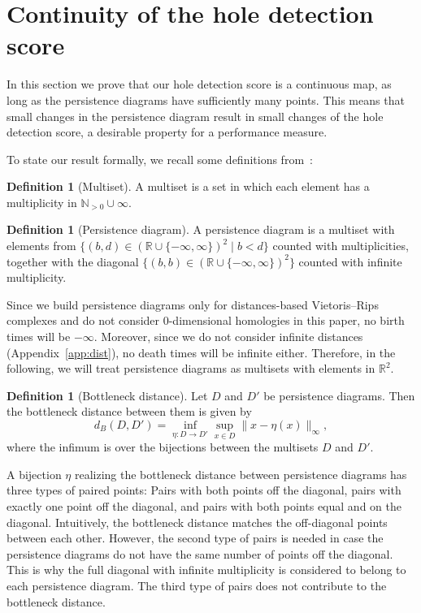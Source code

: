 \documentclass{article}
\theoremstyle{plain}
\theoremstyle{definition}
\newtheorem{definition}[theorem]{Definition}
\theoremstyle{remark}
\begin{document}
\section{Continuity of the hole detection score}\label{app:score_cont}

In this section we prove that our hole detection score is a continuous map, as long as the persistence diagrams have sufficiently many points. This means that small changes in the persistence diagram result in small changes of the hole detection score, a desirable property for a performance measure.

To state our result formally, we recall some definitions from~\citet{cohen2005stability}:

\begin{definition}[Multiset]
    A multiset is a set in which each element has a multiplicity in $\mathbb{N}_{>0}\cup {\infty}$.
\end{definition}

\begin{definition}[Persistence diagram]
    A persistence diagram is a multiset with elements from
    $\{(b, d) \in (\mathbb{R} \cup \{-\infty, \infty\})^2 \mid b<d\}$ counted with multiplicities, together with the diagonal $\{(b,b) \in (\mathbb{R} \cup \{-\infty, \infty\})^2\}$ counted with infinite multiplicity.
\end{definition}

Since we build persistence diagrams only for distances-based Vietoris--Rips complexes and do not consider $0$-dimensional homologies in this paper, no birth times will be $-\infty$. Moreover, since we do not consider infinite distances (Appendix~\ref{app:dist}), no death times will be infinite either. Therefore, in the following, we will treat persistence diagrams as multisets with elements in $\mathbb{R}^2$.

\begin{definition}[Bottleneck distance]
    Let $D$ and $D'$ be persistence diagrams. Then the bottleneck distance between them is given by 
    $$
    d_B(D, D')= \inf_{\eta: D\to D'} \sup_{x\in D} \|x-\eta(x)\|_\infty,
    $$
    where the infimum is over the bijections between the multisets $D$ and $D'$.
\end{definition}

A bijection $\eta$ realizing the bottleneck distance between persistence diagrams has three types of paired points: Pairs with both points off the diagonal, pairs with exactly one point off the diagonal, and pairs with both points equal and on the diagonal. Intuitively, the bottleneck distance matches the off-diagonal points between each other. However, the second type of pairs is needed in case the persistence diagrams do not have the same number of points off the diagonal. This is why the full diagonal with infinite multiplicity is considered to belong to each persistence diagram. The third type of pairs does not contribute to the bottleneck distance.
\end{document}
